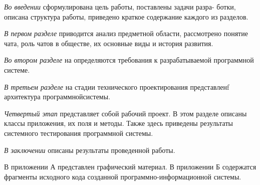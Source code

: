 \emph{Во введении} сформулирована цель работы, поставлены задачи разра-
ботки, описана структура работы, приведено краткое содержание каждого из разделов.

\emph{В первом разделе} приводится анализ предметной области, рассмотрено понятие чата, роль чатов в обществе, их основные виды и история развития. 

\emph{Во втором разделе} на определяются требования к разрабатываемой программной системе.

\emph{В третьем разделе} на стадии технического проектирования представленf архитектура программнойсистемы.

\emph{Четвертый этап} представляет собой рабочий проект. В этом разделе описаны классы приложения, их поля и методы. Также здесь приведены результаты системного тестирования программной системы.

\emph{В заключении} описаны результаты проведенной работы.

В приложении А представлен графический материал.
В приложении Б содержатся фрагменты исходного кода созданной
программно-информационной системы.